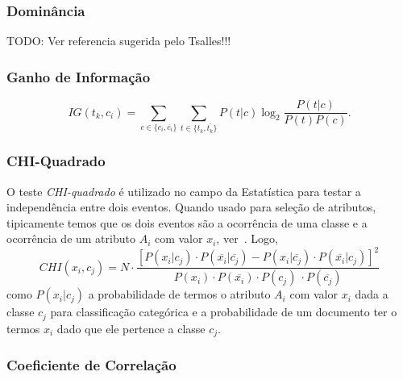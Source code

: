 \subsubsection{Dominância}
\label{subsubsection::dom}
TODO: Ver referencia sugerida pelo Tsalles!!! 

\subsubsection{Ganho de Informação}
\label{subsubsection::ig}

\cite{couto06}
\begin{equation}\label{eqn::ig}
   IG(t_k, c_i) = \sum_{c \in \{c_i, \overline{c_i}\}}\sum_{t \in \{t_k, \overline{t_k}\}}P(t|c)\log_2\frac{P(t|c)}{P(t)P(c)}.
\end{equation}

\subsubsection{CHI-Quadrado}
\label{subsubsection::chi}

O teste \textit{CHI-quadrado} é utilizado no campo da Estatística para testar a independência entre dois eventos. Quando usado para seleção de atributos, tipicamente temos que os dois eventos são a ocorrência de uma classe e a ocorrência de um atributo $A_i$ com valor $x_i$, ver~\cite{Zheng03}. Logo,
\begin{equation}\label{eqn::chi}
   CHI(x_i, c_j) = N \cdot \frac{ [ P(x_i|c_j) \cdot P(\overline{x_i}|\overline{c_j}) - P(x_i|\overline{c_j}) \cdot P(\overline{x_i}|c_j) ]^2 } {P(x_i) \cdot P(\overline{x_i}) \cdot P(c_j) \ \cdot P(\overline{c_j}) }
\end{equation}
como $P(x_i|c_j)$ a probabilidade de termos o atributo $A_i$ com valor $x_i$ dada a classe $c_j$ para classificação categórica e a probabilidade de um documento ter o termos $x_i$ dado que ele pertence a classe $c_j$. 

\subsubsection{Coeficiente de Correlação}
\label{subsubsection::cc}

